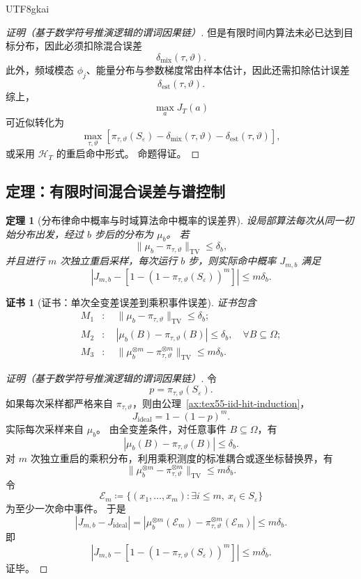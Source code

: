 \documentclass[12pt]{article}
\newtheorem{theorem}{定理}[section]
\newtheorem{Certificate}{证书}[section]
\newcommand{\DefEq}{\coloneqq}
\newcommand{\TV}{\mathrm{TV}}
\begin{document}
\begin{CJK*}{UTF8}{gkai}
\begin{proof}[证明（基于数学符号推演逻辑的谓词因果链）]
但是有限时间内算法未必已达到目标分布，因此必须扣除混合误差
\[
  \delta_{\mathrm{mix}}(\tau,\vartheta).
\]
此外，频域模态 \(\phi_j\)、能量分布与参数梯度常由样本估计，因此还需扣除估计误差
\[
  \delta_{\mathrm{est}}(\tau,\vartheta).
\]
综上，
\[
  \max_a J_T(a)
\]
可近似转化为
\[
  \max_{\tau,\vartheta}
  \left[
    \pi_{\tau,\vartheta}(S_\varepsilon)
    -
    \delta_{\mathrm{mix}}(\tau,\vartheta)
    -
    \delta_{\mathrm{est}}(\tau,\vartheta)
  \right],
\]
或采用 \(\mathcal H_T\) 的重启命中形式。
命题得证。
\end{proof}

\subsection{定理：有限时间混合误差与谱控制}
\label{subsec:tex55-mixing-theorems-law}

\begin{theorem}[分布律命中概率与时域算法命中概率的误差界]
\label{thm:tex55-finite-time-hit-error}
设局部算法每次从同一初始分布出发，经过 \(b\) 步后的分布为 \(\mu_b\)。
若
\[
  \|\mu_b-\pi_{\tau,\vartheta}\|_{\TV}\le\delta_b,
\]
并且进行 \(m\) 次独立重启采样，每次运行 \(b\) 步，则实际命中概率 \(J_{m,b}\) 满足
\[
  \left|
  J_{m,b}
  -
  \left[
  1-
  \left(
  1-\pi_{\tau,\vartheta}(S_\varepsilon)
  \right)^m
  \right]
  \right|
  \le
  m\delta_b.
\]
\end{theorem}

\begin{Certificate}[证书：单次全变差误差到乘积事件误差]
\label{cert:tex55-finite-time-hit-error}
证书包含
\[
\begin{aligned}
  M_1&:\quad
  \|\mu_b-\pi_{\tau,\vartheta}\|_{\TV}\le\delta_b;\\
  M_2&:\quad
  |\mu_b(B)-\pi_{\tau,\vartheta}(B)|\le\delta_b,\quad \forall B\subseteq\Omega;\\
  M_3&:\quad
  \|\mu_b^{\otimes m}-\pi_{\tau,\vartheta}^{\otimes m}\|_{\TV}\le m\delta_b.
\end{aligned}
\]
\end{Certificate}

\begin{proof}[证明（基于数学符号推演逻辑的谓词因果链）]
令
\[
  p=\pi_{\tau,\vartheta}(S_\varepsilon).
\]
如果每次采样都严格来自 \(\pi_{\tau,\vartheta}\)，则由公理~\ref{ax:tex55-iid-hit-induction}，
\[
  J_{\mathrm{ideal}}
  =
  1-(1-p)^m.
\]
实际每次采样来自 \(\mu_b\)。
由全变差条件，对任意事件 \(B\subseteq\Omega\)，有
\[
  |\mu_b(B)-\pi_{\tau,\vartheta}(B)|\le\delta_b.
\]
对 \(m\) 次独立重启的乘积分布，利用乘积测度的标准耦合或逐坐标替换界，有
\[
  \|\mu_b^{\otimes m}-\pi_{\tau,\vartheta}^{\otimes m}\|_{\TV}\le m\delta_b.
\]
令
\[
  \mathcal E_m
  \DefEq
  \{(x_1,\ldots,x_m):\exists i\le m,\ x_i\in S_\varepsilon\}
\]
为至少一次命中事件。
于是
\[
  |J_{m,b}-J_{\mathrm{ideal}}|
  =
  |\mu_b^{\otimes m}(\mathcal E_m)-\pi_{\tau,\vartheta}^{\otimes m}(\mathcal E_m)|
  \le
  m\delta_b.
\]
即
\[
  \left|
  J_{m,b}
  -
  \left[
  1-
  \left(
  1-\pi_{\tau,\vartheta}(S_\varepsilon)
  \right)^m
  \right]
  \right|
  \le
  m\delta_b.
\]
证毕。
\end{proof}


\end{CJK*}
\end{document}
